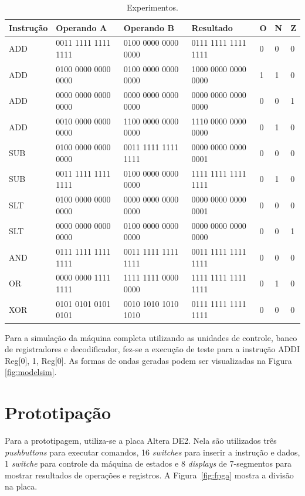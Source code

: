 \documentclass[11pt,a4paper,titlepage]{article}
\begin{document}
\begin{table}[t]
\centering
\begin{tabular}{|l|l|l|l|l|l|l|}
\hline
Instrução & Operando A & Operando B & Resultado & O & N & Z \\
\hline
ADD & 0011 1111 1111 1111 & 0100 0000 0000 0000 & 0111 1111 1111 1111 & 0 & 0 & 0 \\
ADD & 0100 0000 0000 0000 & 0100 0000 0000 0000 & 1000 0000 0000 0000 & 1 & 1 & 0 \\
ADD & 0000 0000 0000 0000 & 0000 0000 0000 0000 & 0000 0000 0000 0000 & 0 & 0 & 1 \\
ADD & 0010 0000 0000 0000 & 1100 0000 0000 0000 & 1110 0000 0000 0000 & 0 & 1 & 0 \\
SUB & 0100 0000 0000 0000 & 0011 1111 1111 1111 & 0000 0000 0000 0001 & 0 & 0 & 0 \\
SUB & 0011 1111 1111 1111 & 0100 0000 0000 0000 & 1111 1111 1111 1111 & 0 & 1 & 0 \\
SLT & 0100 0000 0000 0000 & 0000 0000 0000 0000 & 0000 0000 0000 0001 & 0 & 0 & 0 \\
SLT & 0000 0000 0000 0000 & 0100 0000 0000 0000 & 0000 0000 0000 0000 & 0 & 0 & 1 \\
AND & 0111 1111 1111 1111 & 0011 1111 1111 1111 & 0011 1111 1111 1111 & 0 & 0 & 0 \\
OR  & 0000 0000 1111 1111 & 1111 1111 0000 0000 & 1111 1111 1111 1111 & 0 & 1 & 0 \\
XOR & 0101 0101 0101 0101 & 0010 1010 1010 1010 & 0111 1111 1111 1111 & 0 & 0 & 0 \\
\hline
\end{tabular}
\caption{Experimentos.}
\label{tab:experiments}
\end{table}
%

Para a simulação da máquina completa utilizando as unidades de controle, banco de registradores e decodificador, fez-se a execução de teste para a instrução ADDI Reg[0], 1, Reg[0]. As formas de ondas geradas podem ser visualizadas na Figura \ref{fig:modelsim}.


\section{Prototipação}

Para a prototipagem, utiliza-se a placa Altera DE2. Nela são utilizados três \textit{pushbuttons} para executar comandos, 16 \textit{switches} para inserir a instrução e dados, 1 \textit{switche} para controle da máquina de estados e 8 \textit{displays} de 7-segmentos para mostrar resultados de operações e registros. A Figura~\ref{fig:fpga} mostra a divisão na placa.
\end{document}
